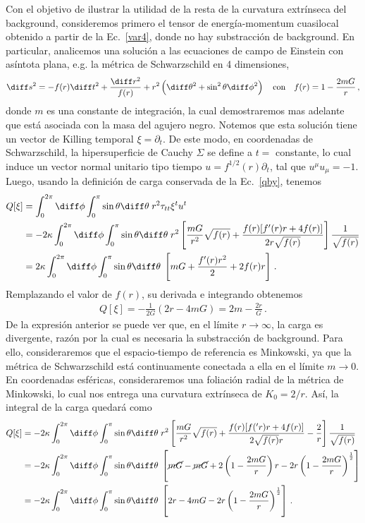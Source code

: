 \documentclass[../Main.tex]{subfiles}
\begin{document}
Con el objetivo de ilustrar la utilidad de la resta de la curvatura extrínseca del background, consideremos primero el tensor de energía-momentum cuasilocal obtenido a partir de la Ec.~\eqref{var4}, donde no hay substracción de background. En particular, analicemos una solución a las ecuaciones de campo de Einstein con asíntota plana, e.g. la métrica de Schwarzschild en 4 dimensiones,
\begin{align}
    \diff s^2=-f(r)\diff t^2+\frac{\diff r^2}{f(r)}+r^2\left(\diff \theta^2+\sin^2\theta\diff \phi^2\right)\,\,\,\,\,\,\mbox{con}\,\,\,\,\,\, f(r)=1-\frac{2mG}{r}\, ,
\end{align} \label{schw}
donde $m$ es una constante de integración, la cual demostraremos mas adelante que está asociada con la masa del agujero negro. Notemos que esta solución tiene un vector de Killing temporal $\xi=\partial_{t}$. De este modo, en coordenadas de Schwarzschild, la hipersuperficie de Cauchy $\Sigma$ se define a $t=$ constante, lo cual induce un vector normal unitario tipo tiempo $u=f^{1/2}(r)\partial_{t}$, tal que $u^{\mu}u_{\mu}=-1$. Luego, usando la definición de carga conservada de la Ec.~\eqref{qby}, tenemos
\begin{align}\notag
Q[\xi]&=\int^{2\pi}_{0}\diff\phi\int^{\pi}_{0}\sin\theta\diff\theta\; r^2\tau_{tt}\xi^{t}u^{t} \\ \notag
&=-2\kappa\int^{2\pi}_{0}\diff\phi\int^{\pi}_{0}\sin\theta\diff\theta \; r^2\left[\frac{mG}{r^2}\sqrt{f(r)}+\frac{f(r)[f'(r)r+4f(r)]}{2r\sqrt{f(r)}}\right]\frac{1}{\sqrt{f(r)}}\\
&=2\kappa\int^{2\pi}_{0}\diff\phi\int^{\pi}_{0}\sin\theta\diff\theta \;\left[mG+\frac{f'(r)r^2}{2}+2f(r)r\right] \, .
\end{align}
Remplazando el valor de $f(r)$, su derivada e integrando obtenemos
\begin{align}
    Q[\xi]=-\frac{1}{2G}(2r-4mG)=2m-\frac{2r}{G} \, .
\end{align}
De la expresión anterior se puede ver que, en el límite $r\to\infty$, la carga es divergente, razón por la cual es necesaria la substracción de background. Para ello, consideraremos que el espacio-tiempo de referencia es Minkowski, ya que la métrica de Schwarzschild está continuamente conectada a ella en el límite $m\to 0$. En coordenadas esféricas, consideraremos una foliación radial de la métrica de Minkowski, lo cual nos entrega una curvatura extrínseca de $K_{0}=2/r$. Así, la integral de la carga quedará como
\begin{align}\notag
Q[\xi]&=-2\kappa\int^{2\pi}_{0}\diff\phi\int^{\pi}_{0}\sin\theta\diff\theta \; r^2\left[\frac{mG}{r^2}\sqrt{f(r)}+\frac{f(r)[f('r)r+4f(r)]}{2\sqrt{f(r)}r}-\frac{2}{r}\right]\frac{1}{\sqrt{f(r)}}  \\ \notag
&=-2\kappa\int^{2\pi}_{0}\diff\phi\int^{\pi}_{0}\sin\theta\diff\theta \;\left[\cancel{mG}-\cancel{mG}+2\left(1-\frac{2mG}{r}\right)r-2r\left(1-\frac{2mG}{r}\right)^{\frac{1}{2}}\right]\\
&=-2\kappa\int^{2\pi}_{0}\diff\phi\int^{\pi}_{0}\sin\theta\diff\theta \;\left[2r-4mG-2r\left(1-\frac{2mG}{r}\right)^{\frac{1}{2}}\right]\, .
\end{align}
\end{document}

